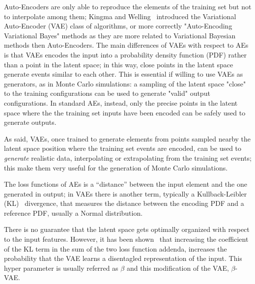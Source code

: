 Auto-Encoders are only able to reproduce the elements of the training set but not to interpolate among them; Kingma and Welling~\cite{Kingma2014} introduced the Variational Auto-Encoder (VAE) class of algorithms, or more correctly "Auto-Encoding Variational Bayes" methods as they are more related to Variational Bayesian methods then Auto-Encoders.
The main differences of VAEs with respect to AEs is that VAEs encodes the input into a probability density function (PDF) rather than a point in the latent space; in this way, close points in the latent space generate events similar to each other.
This is essential if willing to use VAEs as generators, as in Monte Carlo simulations: a sampling of the latent space "close" to the training configurations can be used to generate "valid" output configurations. In standard AEs, instead, only the precise points in the latent space where the the training set inputs have been encoded can be safely used to generate outputs.

As said, VAEs, once trained to generate elements from points sampled nearby the latent space position where the training set events are encoded,
can be used to \emph{generate} realistic data, 
interpolating or extrapolating from the training set events; this make them very useful for the generation of Monte Carlo simulations.

The loss functions of AEs is a ``distance'' between the input element and the one generated in output; in VAEs there is another term, typically a Kullback-Leibler (KL)~\cite{Kullback1951} divergence, that measures the distance between the encoding PDF and a reference PDF, usually a Normal distribution.

There is no guarantee that the latent space gets optimally organized with respect to the input features. However, it has been shown~\cite{Kingma2019} that increasing the coefficient of the KL term in the sum of the two loss function addenda, increases the probability that the VAE learns a disentagled representation of the input. This hyper parameter is usually referred as $\beta$ and this modification of the VAE, $\beta$-VAE.

